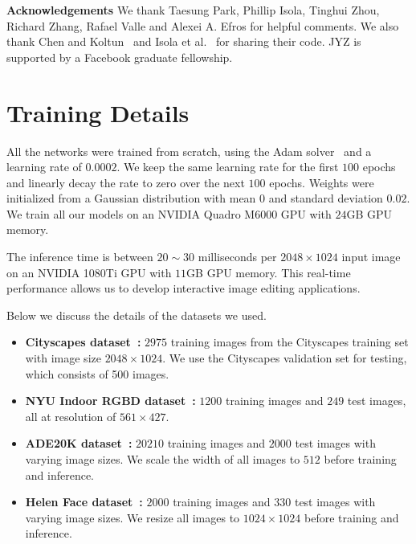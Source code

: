 \documentclass[10pt,twocolumn,letterpaper]{article}
\newcommand{\ck}{Chen and Koltun~\cite{chen2017photographic}\xspace}
\begin{document}
\vspace{.15in}
{\noindent \bf Acknowledgements} We thank Taesung Park, Phillip Isola, Tinghui Zhou, Richard Zhang, Rafael Valle and Alexei A. Efros for helpful comments. We also thank \ck and Isola et al.~\cite{isola2016image} for sharing their code. JYZ is supported by a Facebook graduate fellowship. 
\clearpage{\thispagestyle{empty}\cleardoublepage}


\clearpage 

\appendix
\section{Training Details}
All the networks were trained from scratch, using the Adam solver~\cite{kingma2014adam} and a learning rate of $0.0002$. We keep the same learning rate for the first $100$ epochs and linearly decay the rate to zero over the next $100$ epochs. Weights were initialized from a Gaussian distribution with mean $0$ and standard deviation $0.02$. We train all our models on an NVIDIA Quadro M6000 GPU with $24$GB GPU memory.

The inference time is between $20\sim 30$ milliseconds per $2048\times1024$ input image on an NVIDIA 1080Ti GPU with $11$GB GPU memory. This real-time performance allows us to develop interactive image editing applications. 

Below we discuss the details of the datasets we used. 

\begin{itemize}
    \item {\bf Cityscapes dataset~\cite{Cordts2016cityscapes}: } $2975$ training images from the Cityscapes training set with image size $2048 \times 1024$. We use the Cityscapes validation set for testing, which consists of 500 images.
    
    \item {\bf NYU Indoor RGBD dataset~\cite{Silberman2012indoor}: }
$1200$ training images and $249$ test images, all at resolution of $561\times 427$.

    \item {\bf ADE20K dataset~\cite{zhou2017scene}: }
$20210$ training images and $2000$ test images with varying image sizes. We scale the width of all images to $512$ before training and inference.

    \item {\bf Helen Face dataset~\cite{le2012interactive,smith2013exemplar}: }
$2000$ training images and $330$ test images with varying image sizes. We resize all images to $1024\times 1024$ before training and inference.
\end{itemize}
\end{document}
